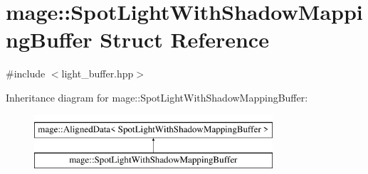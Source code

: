 \hypertarget{structmage_1_1_spot_light_with_shadow_mapping_buffer}{}\section{mage\+:\+:Spot\+Light\+With\+Shadow\+Mapping\+Buffer Struct Reference}
\label{structmage_1_1_spot_light_with_shadow_mapping_buffer}


{\ttfamily \#include $<$light\+\_\+buffer.\+hpp$>$}

Inheritance diagram for mage\+:\+:Spot\+Light\+With\+Shadow\+Mapping\+Buffer\+:\begin{figure}[H]
\begin{center}
\leavevmode
\includegraphics[height=2.000000cm]{structmage_1_1_spot_light_with_shadow_mapping_buffer}
\end{center}
\end{figure}
